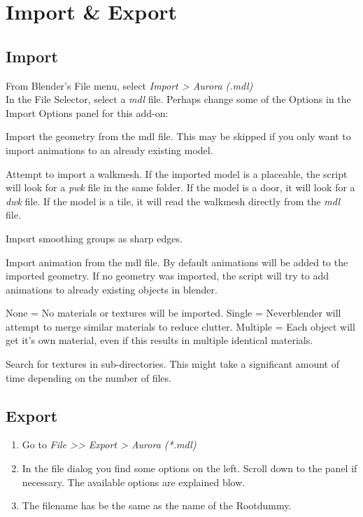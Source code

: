\chapter{Import \& Export}

\section{Import}
From Blender's File menu, select \textit{Import > Aurora (.mdl)} \\

In the File Selector, select a \textit{mdl} file. Perhaps change some of the Options in 
the Import Options panel for this add-on: 

\begin{description}[leftmargin=13em,style=nextline]
    \item[Import Geometry] Import the geometry from the mdl file. This may be skipped if you only want to import animations to an already existing model.
    \item[Import Walkmesh] Attempt to import a walkmesh. If the imported model is a placeable, the script will look for a {\textit{pwk}} file in the same folder. If the model is a door, it will look for a {\textit{dwk}} file. If the model is a tile, it will read the walkmesh directly from the \textit{mdl} file.
    \item[Import Smooth Groups] Import smoothing groups as sharp edges.
    \item[Import Animations] Import animation from the mdl file. By default animations will be added to the imported geometry. If no geometry was imported, the script will try to add animations to already existing objects in blender.
    \item[Materials] None = No materials or textures will be imported. Single = Neverblender will attempt to merge similar materials to reduce clutter. Multiple = Each object will get it's own material, even if this results in multiple identical materials.
    \item[Image Search] Search for textures in sub-directories. This might take a significant amount of time depending on the number of files.
\end{description}

\section{Export}
\begin{enumerate}
	\item Go to \textit{File >> Export > Aurora (*.mdl)}
	\item In the file dialog you find some options on the left. Scroll down to the panel if necessary. The available options are explained blow.
	\item The filename has be the same as the name of the Rootdummy.
\end{enumerate}

